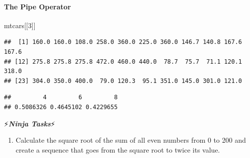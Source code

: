 \documentclass[]{article}
\newenvironment{Shaded}{\begin{snugshade}}{\end{snugshade}}
\newcommand{\KeywordTok}[1]{\textcolor[rgb]{0.13,0.29,0.53}{\textbf{#1}}}
\newcommand{\DataTypeTok}[1]{\textcolor[rgb]{0.13,0.29,0.53}{#1}}
\newcommand{\DecValTok}[1]{\textcolor[rgb]{0.00,0.00,0.81}{#1}}
\newcommand{\StringTok}[1]{\textcolor[rgb]{0.31,0.60,0.02}{#1}}
\newcommand{\ControlFlowTok}[1]{\textcolor[rgb]{0.13,0.29,0.53}{\textbf{#1}}}
\newcommand{\OperatorTok}[1]{\textcolor[rgb]{0.81,0.36,0.00}{\textbf{#1}}}
\newcommand{\NormalTok}[1]{#1}
\providecommand{\tightlist}{%
  \setlength{\itemsep}{0pt}\setlength{\parskip}{0pt}}
\let\oldparagraph\paragraph
\renewcommand{\paragraph}[1]{\oldparagraph{#1}\mbox{}}
\begin{document}
\paragraph{The Pipe Operator}\label{the-pipe-operator}

\begin{Shaded}
\begin{Highlighting}[]
\NormalTok{mtcars[[}\DecValTok{3}\NormalTok{]]}
\end{Highlighting}
\end{Shaded}

\begin{verbatim}
##  [1] 160.0 160.0 108.0 258.0 360.0 225.0 360.0 146.7 140.8 167.6 167.6
## [12] 275.8 275.8 275.8 472.0 460.0 440.0  78.7  75.7  71.1 120.1 318.0
## [23] 304.0 350.0 400.0  79.0 120.3  95.1 351.0 145.0 301.0 121.0
\end{verbatim}

\begin{Shaded}
\end{Shaded}

\begin{verbatim}
##         4         6         8 
## 0.5086326 0.4645102 0.4229655
\end{verbatim}

⚡\textbf{\emph{Ninja Tasks}}⚡

\begin{enumerate}
\def\labelenumi{\arabic{enumi}.}
\tightlist
\item
  Calculate the square root of the sum of all even numbers from 0 to 200
  and create a sequence that goes from the square root to twice its
  value.
\end{enumerate}
\end{document}
